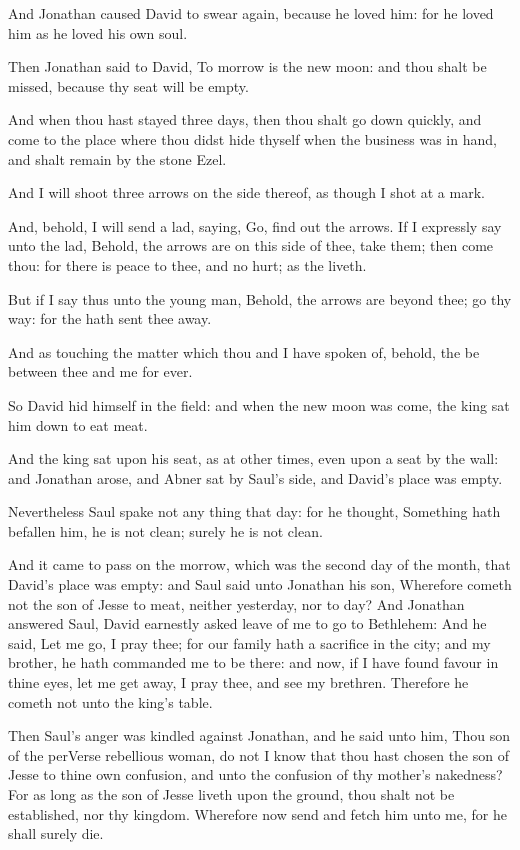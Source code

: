 \Verse And Jonathan caused David to swear again, because he loved him: for he loved him as he loved his own soul.

\Verse Then Jonathan said to David, To morrow is the new moon: and thou shalt be missed, because thy seat will be empty.

\Verse And when thou hast stayed three days, then thou shalt go down quickly, and come to the place where thou didst hide thyself when the business was in hand, and shalt remain by the stone Ezel.

\Verse And I will shoot three arrows on the side thereof, as though I shot at a mark.

\Verse And, behold, I will send a lad, saying, Go, find out the arrows.  If I expressly say unto the lad, Behold, the arrows are on this side of thee, take them; then come thou: for there is peace to thee, and no hurt; as the \LORD liveth.

\Verse But if I say thus unto the young man, Behold, the arrows are beyond thee; go thy way: for the \LORD hath sent thee away.

\Verse And as touching the matter which thou and I have spoken of, behold, the \LORD be between thee and me for ever.

\Verse So David hid himself in the field: and when the new moon was come, the king sat him down to eat meat.

\Verse And the king sat upon his seat, as at other times, even upon a seat by the wall: and Jonathan arose, and Abner sat by Saul's side, and David's place was empty.

\Verse Nevertheless Saul spake not any thing that day: for he thought, Something hath befallen him, he is not clean; surely he is not clean.

\Verse And it came to pass on the morrow, which was the second day of the month, that David's place was empty: and Saul said unto Jonathan his son, Wherefore cometh not the son of Jesse to meat, neither yesterday, nor to day?  \Verse And Jonathan answered Saul, David earnestly asked leave of me to go to Bethlehem: \Verse And he said, Let me go, I pray thee; for our family hath a sacrifice in the city; and my brother, he hath commanded me to be there: and now, if I have found favour in thine eyes, let me get away, I pray thee, and see my brethren. Therefore he cometh not unto the king's table.

\Verse Then Saul's anger was kindled against Jonathan, and he said unto him, Thou son of the perVerse rebellious woman, do not I know that thou hast chosen the son of Jesse to thine own confusion, and unto the confusion of thy mother's nakedness?  \Verse For as long as the son of Jesse liveth upon the ground, thou shalt not be established, nor thy kingdom. Wherefore now send and fetch him unto me, for he shall surely die.

